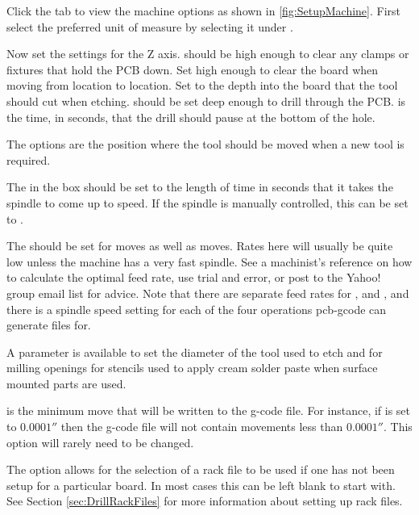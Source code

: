 \documentclass[11pt]{book}
\begin{document}
Click the  tab to view the machine options as shown in \figurename \vref{fig:SetupMachine}. First select the preferred unit of measure by selecting it under . 

Now set the settings for the Z axis.  should be high enough to clear any clamps or fixtures that hold the PCB down. Set  high enough to clear the board when moving from location to location. Set  to the depth into the board that the tool should cut when etching.  should be set deep enough to drill through the PCB.  is the time, in seconds, that the drill should pause at the bottom of the hole.

The  options are the position where the tool should be moved when a new tool is required.

The  in the  box should be set to the length of time in seconds that it takes the spindle to come up to speed. If the spindle is manually controlled, this can be set to .

The  should be set for  moves as well as  moves. Rates here will usually be quite low unless the machine has a very fast spindle. See a machinist's reference on how to calculate the optimal feed rate, use trial and error, or post to the Yahoo! group email list for advice. Note that there are separate feed rates for , and , and there is a spindle speed setting for each of the four operations pcb-gcode can generate files for.

A  parameter is available to set the diameter of the tool used to etch and for milling openings for stencils used to apply cream solder paste when surface mounted parts are used.

 is the minimum move that will be written to the g-code file. For instance, if  is set to $0.0001''$ then the g-code file will not contain movements less than $0.0001''$. This option will rarely need to be changed.

The  option allows for the selection of a rack file to be used if one has not been setup for a particular board. In most cases this can be left blank to start with. See Section \vref{sec:DrillRackFiles} for more information about setting up rack files. 
\end{document}

